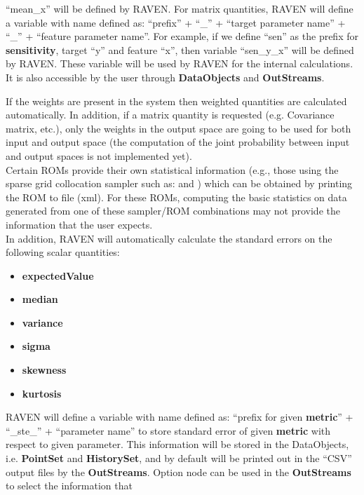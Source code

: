 \begin{itemize}
\begin{itemize}
      ``mean\_x'' will be defined by RAVEN.
      For matrix quantities, RAVEN will define a variable with name defined as: ``prefix'' + ``\_'' + ``target parameter name'' + ``\_'' + ``feature parameter name''.
      For example, if we define ``sen'' as the prefix for \textbf{sensitivity}, target ``y'' and feature ``x'', then
      variable ``sen\_y\_x'' will be defined by RAVEN.
      \nb These variable will be used by RAVEN for the internal calculations. It is also accessible by the user through
      \textbf{DataObjects} and \textbf{OutStreams}.
  \end{itemize}
  \nb If the weights are present in the system then weighted quantities are calculated automatically. In addition, if a matrix quantity is requested (e.g. Covariance matrix, etc.), only the weights in the output space are going to be used for both input and output space (the computation of the joint probability between input and output spaces is not implemented yet).
  \\
  \nb Certain ROMs provide their own statistical information (e.g., those using
  the sparse grid collocation sampler such as: 
  and ) which can be obtained by printing the ROM to file
  (xml). For these ROMs, computing the basic statistics on data generated from
  one of these sampler/ROM combinations may not provide the information that the
  user expects.
  \\
  In addition, RAVEN will automatically calculate the standard errors on the following scalar quantities:
  \begin{itemize}
    \item \textbf{expectedValue}
    \item \textbf{median}
    \item \textbf{variance}
    \item \textbf{sigma}
    \item \textbf{skewness}
    \item \textbf{kurtosis}
  \end{itemize}
  RAVEN will define a variable with name defined as: ``prefix for given \textbf{metric}'' + ``\_ste\_'' + ``parameter name'' to
  store standard error of given \textbf{metric} with respect to given parameter. This information will be stored in the DataObjects,
  i.e. \textbf{PointSet} and \textbf{HistorySet}, and by default will be printed out in the ``CSV'' output files by the
  \textbf{OutStreams}. Option node  can be used in the \textbf{OutStreams} to select the information that

\end{itemize}
